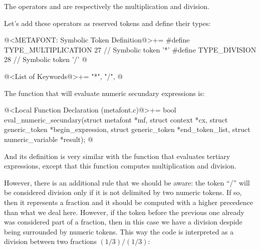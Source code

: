 The operators \monoespaco{*} and \monoespaco{/} are respectively the
multiplication and division.

Let's add these operators as reserved tokens and define their types:

\iniciocodigo
@<METAFONT: Symbolic Token Definition@>+=
#define TYPE_MULTIPLICATION        27 // Symbolic token '*'
#define TYPE_DIVISION              28 // Symbolic token '/'
@
\fimcodigo

\iniciocodigo
@<List of Keywords@>+=
"*", "/",
@
\fimcodigo

The function that will evaluate numeric secundary expressions is:

\iniciocodigo
@<Local Function Declaration (metafont.c)@>+=
bool eval_numeric_secundary(struct metafont *mf, struct context *cx,
                             struct generic_token *begin_expression,
                             struct generic_token *end_token_list,
                             struct numeric_variable *result);
@
\fimcodigo

And its definition is very similar with the function that evaluates
tertiary expressions, except that this function computes
multiplication and division.

However, there is an additional rule that we should be aware: the
token ``/'' will be considered division only if it is not delimited by
two numeric tokens. If so, then it represents a fraction and it should
be computed with a higher precedence than what we deal here. However,
if the token before the previous one already was considered part of a
fraction, then in this case we have a division despide being
surrounded by numeric tokens. This way the code 
is interpreted as a division between two fractions $(1/3)/(1/3)$:

